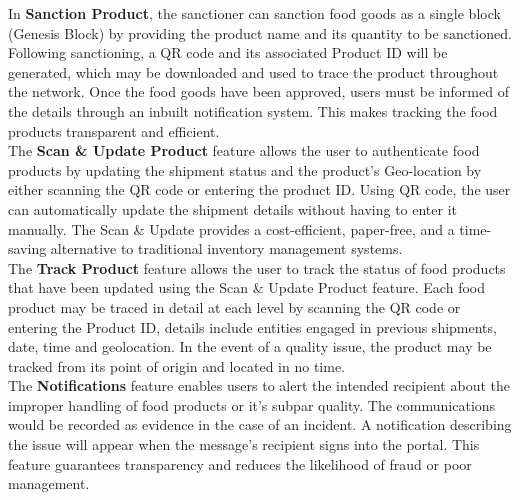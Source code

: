 \documentclass[12pt,a4paper,twocolumn,fleqn]{article}
\begin{document}
In \textbf{Sanction Product}, the sanctioner can sanction food goods as a single block (Genesis Block) by providing the product name and its quantity to be sanctioned. Following sanctioning, a QR code and its associated Product ID will be generated, which may be downloaded and used to trace the product throughout the network. Once the food goods have been approved, users must be informed of the details through an inbuilt notification system. This makes tracking the food products transparent and efficient. \\

The \textbf{Scan \& Update Product} feature allows the user to authenticate food products by updating the shipment status and the product's Geo-location by either scanning the QR code or entering the product ID. Using QR code, the user can automatically update the shipment details without having to enter it manually. The Scan \& Update provides a cost-efficient, paper-free, and a time-saving alternative to traditional inventory management systems. \\

The \textbf{Track Product} feature allows the user to track the status of food products that have been updated using the Scan \& Update Product feature. Each food product may be traced in detail at each level by scanning the QR code or entering the Product ID, details include entities engaged in previous shipments, date, time and geolocation. In the event of a quality issue, the product may be tracked from its point of origin and located in no time. \\

The \textbf{Notifications} feature enables users to alert the intended recipient about the improper handling of food products or it's subpar quality. The communications would be recorded as evidence in the case of an incident. A notification describing the issue will appear when the message's recipient signs into the portal. This feature guarantees transparency and reduces the likelihood of fraud or poor management. \\
\end{document}
